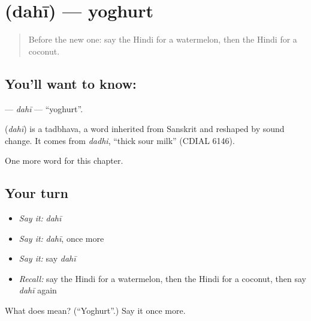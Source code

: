 \section[\texorpdfstring{\hi{दही} (dahī)}{दही (dahī)}]{ (dahī) — yoghurt}

\label{lesson:HI-C140-dahi}



\begin{quote}
Before the new one: say the Hindi for a watermelon, then the Hindi for a coconut.
\end{quote}

\subsection*{You'll want to know: }
\textbf{} — \emph{dahī} — \textquotedblleft{}yoghurt\textquotedblright{}.

\begin{cousinweb}
\textbf{} (\emph{dahī}) is a tadbhava, a word inherited from Sanskrit and reshaped by sound change. It comes from \emph{dadhi}, \textquotedblleft{}thick sour milk\textquotedblright{} (CDIAL 6146).
\end{cousinweb}

\begin{grammarlens}[title={What you've built}]
One more word for this chapter.
\end{grammarlens}

\subsection*{Your turn}
\begin{itemize}
\raggedright
  \item \emph{Say it:} \emph{dahī}
  \item \emph{Say it:} \emph{dahī}, once more
  \item \emph{Say it:} say \emph{dahī}
  \item \emph{Recall:} say the Hindi for a watermelon, then the Hindi for a coconut, then say \emph{dahī} again
\end{itemize}

\begin{tcolorbox}[breakable,colback=teal!4,colframe=teal!35!black,title={Before you move on}]
What does  mean? (\textquotedblleft{}Yoghurt\textquotedblright{}.) Say it once more.
\end{tcolorbox}
